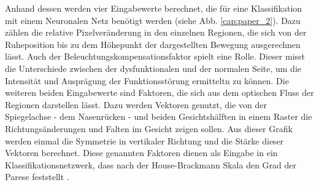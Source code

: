 Anhand dessen werden vier Eingabewerte berechnet, die für eine Klassifikation mit einem Neuronalen Netz benötigt werden (siehe Abb. \ref{cap:paper_2}). Dazu zählen die relative Pixelveränderung in den einzelnen Regionen, die sich von der Ruheposition bis zu dem Höhepunkt der dargestellten Bewegung ausgerechnen lässt. Auch der Beleuchtungskompensationsfaktor spielt eine Rolle. Dieser misst die Unterschiede zwischen der dysfunktionalen und der normalen Seite, um die Intensität und Ausprägung der Funktionsstörung ermitteltn zu können. Die weiteren beiden Eingabewerte sind Faktoren, die sich aus dem optischen Fluss der Regionen darstellen lässt. Dazu werden Vektoren genutzt, die von der Spiegelachse - dem Nasenrücken - und beiden Gesichtshälften in einem Raster die Richtungsänderungen und Falten im Gesicht zeigen sollen. Aus dieser Grafik werden einmal die Symmetrie in vertikaler Richtung und die Stärke dieser Vektoren berechnet. Diese genannten Faktoren dienen als Eingabe in ein Klassifikationsnetzwerk, dass nach der House-Brackmann Skala den Grad der Parese feststellt \cite{detection_fp1}.
